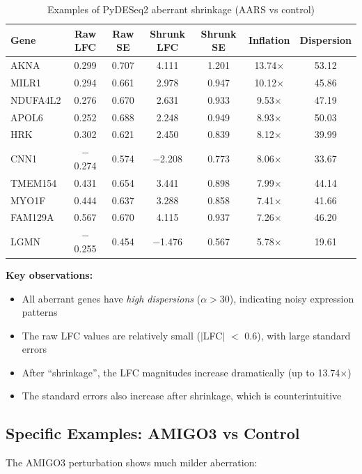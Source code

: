 \documentclass{article}
\begin{document}
\begin{table}[h]
\centering
\caption{Examples of PyDESeq2 aberrant shrinkage (AARS vs control)}
\label{tab:examples_aars}
\begin{tabular}{lcccccc}
\toprule
Gene & Raw LFC & Raw SE & Shrunk LFC & Shrunk SE & Inflation & Dispersion \\
\midrule
AKNA     & 0.299 & 0.707 & 4.111 & 1.201 & 13.74$\times$ & 53.12 \\
MILR1    & 0.294 & 0.661 & 2.978 & 0.947 & 10.12$\times$ & 45.86 \\
NDUFA4L2 & 0.276 & 0.670 & 2.631 & 0.933 & 9.53$\times$  & 47.19 \\
APOL6    & 0.252 & 0.688 & 2.248 & 0.949 & 8.93$\times$  & 50.03 \\
HRK      & 0.302 & 0.621 & 2.450 & 0.839 & 8.12$\times$  & 39.99 \\
CNN1     & $-$0.274 & 0.574 & $-$2.208 & 0.773 & 8.06$\times$ & 33.67 \\
TMEM154  & 0.431 & 0.654 & 3.441 & 0.898 & 7.99$\times$  & 44.14 \\
MYO1F    & 0.444 & 0.637 & 3.288 & 0.858 & 7.41$\times$  & 41.66 \\
FAM129A  & 0.567 & 0.670 & 4.115 & 0.937 & 7.26$\times$  & 46.20 \\
LGMN     & $-$0.255 & 0.454 & $-$1.476 & 0.567 & 5.78$\times$ & 19.61 \\
\bottomrule
\end{tabular}
\end{table}

\textbf{Key observations:}
\begin{itemize}
    \item All aberrant genes have \emph{high dispersions} ($\alpha > 30$), indicating noisy expression patterns
    \item The raw LFC values are relatively small ($|$LFC$|$ $<$ 0.6), with large standard errors
    \item After ``shrinkage'', the LFC magnitudes increase dramatically (up to 13.74$\times$)
    \item The standard errors also increase after shrinkage, which is counterintuitive
\end{itemize}

\subsection{Specific Examples: AMIGO3 vs Control}

The AMIGO3 perturbation shows much milder aberration:
\end{document}
